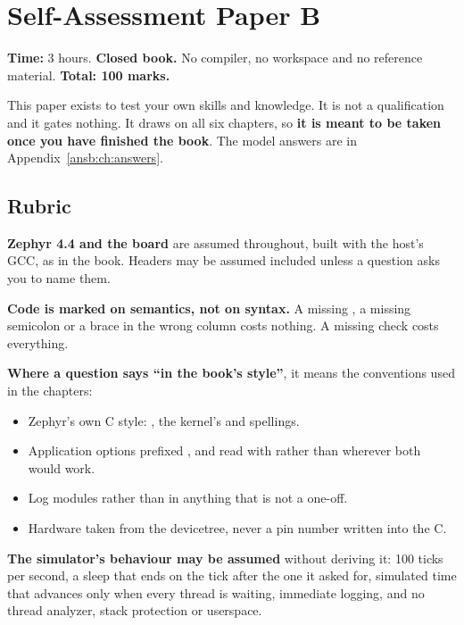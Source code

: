 
\chapter{Self-Assessment Paper B}
\label{exb:ch:paper}

\noindent\textbf{Time:} 3 hours. \textbf{Closed book.} No compiler, no workspace and no reference
material. \textbf{Total: 100 marks.}

This paper exists to test your own skills and knowledge. It is not a qualification and it gates
nothing. It draws on all six chapters, so \textbf{it is meant to be taken once you have finished
the book}. The model answers are in Appendix~\ref{ansb:ch:answers}.

\section*{Rubric}
\textbf{Zephyr 4.4 and the board } are assumed throughout, built with the
host's GCC, as in the book. Headers may be assumed included unless a question asks you to name them.

\textbf{Code is marked on semantics, not on syntax.} A missing , a missing semicolon
or a brace in the wrong column costs nothing. A missing  check costs
everything.

\textbf{Where a question says ``in the book's style''}, it means the conventions used in the
chapters:
\begin{itemize}
  \item Zephyr's own C style: , the kernel's  and  spellings.
  \item Application options prefixed , and read with  rather than
     wherever both would work.
  \item Log modules rather than  in anything that is not a one-off.
  \item Hardware taken from the devicetree, never a pin number written into the C.
\end{itemize}

\textbf{The simulator's behaviour may be assumed} without deriving it: 100 ticks per second, a sleep
that ends on the tick after the one it asked for, simulated time that advances only when every
thread is waiting, immediate logging, and no thread analyzer, stack protection or userspace.

